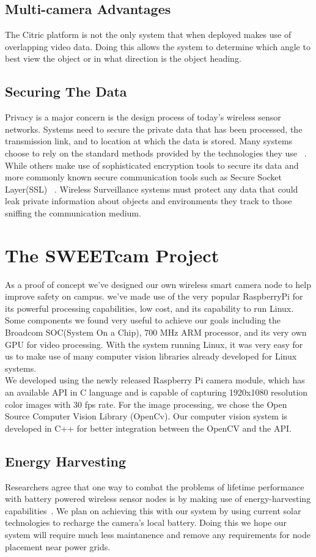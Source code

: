 \documentclass[journal,transmag]{IEEEtran}
\begin{document}
\subsection{Multi-camera Advantages}
The Citric platform is not the only system that when deployed makes use of overlapping video data. Doing this allows the system to determine which angle 
to best view the object or in what direction is the object heading.

\subsection{Securing The Data}
Privacy is a major concern is the design process of today's wireless sensor networks. Systems need to secure the private data that has been processed, the
transmission link, and to location at which the data is stored. Many systems choose to rely on the standard methods provided by the technologies they use
~\cite{HuSIMS}. While others make use of sophisticated encryption tools to secure its data and more commonly known secure communication tools such as Secure
Socket Layer(SSL) ~\cite{OmniEye}. Wireless Surveillance systems must protect any data that could leak private information about objects and environments they track to those
sniffing the communication medium. 

\section{The SWEETcam Project}
As a proof of concept we've designed our own wireless smart camera node to help improve safety on campus. we've made use of the very popular RaspberryPi for
its powerful processing capabilities, low cost, and its capability to run Linux. Some components we found very useful to achieve our goals including the 
Broadcom SOC(System On a Chip), 700 MHz ARM processor, and its very own GPU for video processing. With the system running Linux, it was very easy for us to
make use of many computer vision libraries already developed for Linux systems.\\
We developed using the newly released Raspberry Pi camera module, which has an available API in C language and is capable of capturing 1920x1080 resolution
color images with 30 fps rate. For the image processing, we chose the Open Source Computer Vision Library (OpenCv). Our computer vision system is developed in 
C++ for better integration between the OpenCV and the API.

\subsection{Energy Harvesting}
Researchers agree that one way to combat the problems of lifetime performance with battery powered wireless sensor nodes is by making use of energy-harvesting
capabilities~\cite{EnergyHarvesting}. We plan on achieving this with our system by using current solar technologies to recharge the camera's local battery. 
Doing this we hope our system will require much less maintanence and remove any requirements for node placement near power grids.
\end{document}
